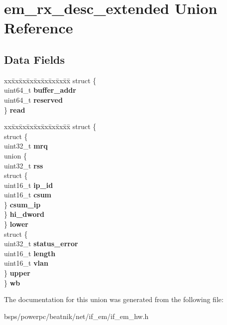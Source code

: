 \hypertarget{unionem__rx__desc__extended}{}\section{em\+\_\+rx\+\_\+desc\+\_\+extended Union Reference}
\label{unionem__rx__desc__extended}
\subsection*{Data Fields}
\begin{DoxyCompactItemize}
\item 
\mbox{\label{unionem__rx__desc__extended_a990ce4d7ba929dfa97e07c52ab0041a2}} 
\begin{tabbing}
xx\=xx\=xx\=xx\=xx\=xx\=xx\=xx\=xx\=\kill
struct \{\\
\>uint64\_t {\bfseries buffer\_addr}\\
\>uint64\_t {\bfseries reserved}\\
\} {\bfseries read}\\

\end{tabbing}\item 
\mbox{\label{unionem__rx__desc__extended_a673a86e77be06a7b3d0d46ce662062a1}} 
\begin{tabbing}
xx\=xx\=xx\=xx\=xx\=xx\=xx\=xx\=xx\=\kill
struct \{\\
\>struct \{\\
\>\>uint32\_t {\bfseries mrq}\\
\>\>union \{\\
\>\>\>uint32\_t {\bfseries rss}\\
\>\>\>struct \{\\
\>\>\>\>uint16\_t {\bfseries ip\_id}\\
\>\>\>\>uint16\_t {\bfseries csum}\\
\>\>\>\} {\bfseries csum\_ip}\\
\>\>\} {\bfseries hi\_dword}\\
\>\} {\bfseries lower}\\
\>struct \{\\
\>\>uint32\_t {\bfseries status\_error}\\
\>\>uint16\_t {\bfseries length}\\
\>\>uint16\_t {\bfseries vlan}\\
\>\} {\bfseries upper}\\
\} {\bfseries wb}\\

\end{tabbing}\end{DoxyCompactItemize}


The documentation for this union was generated from the following file\+:\begin{DoxyCompactItemize}
\item 
bsps/powerpc/beatnik/net/if\+\_\+em/if\+\_\+em\+\_\+hw.\+h\end{DoxyCompactItemize}
